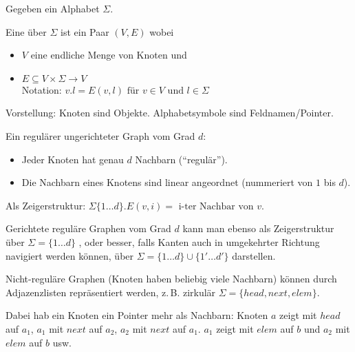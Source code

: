 \begin{definition}

    Gegeben ein Alphabet $\Sigma$.

    Eine  über $\Sigma$ ist ein Paar $(V, E)$ wobei
    \begin{itemize}
        \item $V$ eine endliche Menge von Knoten und
        \item $E \subseteq V \times \Sigma \rightarrow V$
                \\
                Notation: $v.l = E(v,l) \text{ für } v \in V \text{ und } l \in \Sigma$
    \end{itemize}

    Vorstellung: Knoten sind Objekte. Alphabetsymbole sind Feldnamen/Pointer.


\end{definition}

\begin{beispiel}

    Ein regulärer ungerichteter Graph vom Grad $d$:
    \begin{itemize}
        \item Jeder Knoten hat genau $d$ Nachbarn (``regulär'').
        \item Die Nachbarn eines Knotens sind linear angeordnet (nummeriert von $1$ bis $d$).
    \end{itemize}


    Als Zeigerstruktur: $\Sigma \{ 1 \dots d \} . E(v,i) = \text{ i-ter Nachbar von } v$.

\end{beispiel}

\begin{beispiel}
    
    Gerichtete reguläre Graphen vom Grad $d$ kann man ebenso als Zeigerstruktur über $\Sigma = \{ 1 \dots d \}$ , oder besser, falls Kanten auch in umgekehrter Richtung navigiert werden können, über $\Sigma = \{ 1 \dots d \} \cup \{ 1' \dots d' \} $ darstellen.

\end{beispiel}

\begin{beispiel}
    
    Nicht-reguläre Graphen (Knoten haben beliebig viele Nachbarn) können durch Adjazenzlisten repräsentiert werden, z.\,B. zirkulär $\Sigma = \{ head, next, elem \}$.

    Dabei hab ein Knoten ein Pointer mehr als Nachbarn: Knoten $a$ zeigt mit $head$ auf $a_1$, $a_1$ mit $next$ auf $a_2$, $a_2$ mit $next$ auf $a_1$. $a_1$ zeigt mit $elem$ auf $b$ und $a_2$ mit $elem$ auf $b$ usw.

\end{beispiel}

